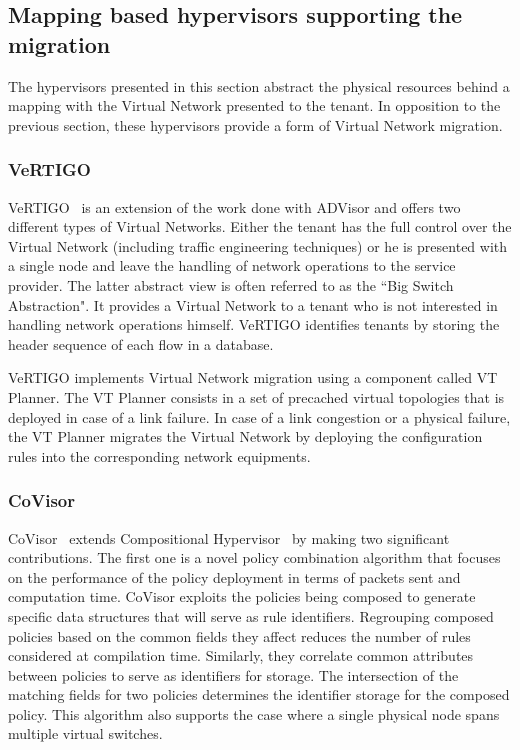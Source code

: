 \subsection{Mapping based hypervisors supporting the migration}
The hypervisors presented in this section abstract the physical resources behind a mapping with the Virtual Network presented to the tenant. In opposition to the previous section, these hypervisors provide a form of Virtual Network migration. 

\subsubsection{VeRTIGO}
VeRTIGO~\cite{VeRTIGO-Corin2012a} is an extension of the work done with ADVisor and offers two different types of Virtual Networks.
Either the tenant has the full control over the Virtual Network (including traffic engineering techniques) or he is presented with a single node and leave the handling of network operations to the service provider.
The latter abstract view is often referred to as the ``Big Switch Abstraction".
It provides a Virtual Network to a tenant who is not interested in handling network operations himself.
VeRTIGO identifies tenants by storing the header sequence of each flow in a database.

VeRTIGO implements Virtual Network migration using a component called VT Planner. The VT Planner consists in a set of precached virtual topologies that is deployed in case of a link failure. In case of a link congestion or a physical failure, the VT Planner migrates the Virtual Network by deploying the configuration rules into the corresponding network equipments.

\subsubsection{CoVisor}
CoVisor~\cite{CoVisor-Jin2015} extends Compositional Hypervisor~\cite{CompositionalHypervisor-Jin2014} by making two significant contributions.
The first one is a novel policy combination algorithm that focuses on the performance of the policy deployment in terms of packets sent and computation time.
CoVisor exploits the policies being composed to generate specific data structures that will serve as rule identifiers.
Regrouping composed policies based on the common fields they affect reduces the number of rules  considered at compilation time.
Similarly, they correlate common attributes between policies to serve as identifiers for storage. The intersection of the matching fields for two policies determines the identifier storage for the composed policy.
This algorithm also supports the case where a single physical node spans multiple virtual switches.

